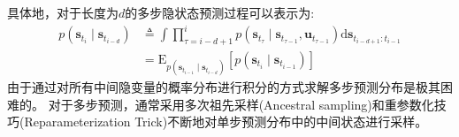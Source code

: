 具体地，对于长度为$d$的多步隐状态预测过程可以表示为:
\begin{equation}
\begin{aligned}
p\left(\boldsymbol{s}_{t_i} \mid \boldsymbol{s}_{t_{i-d}}\right) & \triangleq \int \prod_{\tau=i-d+1}^{i} p\left(\boldsymbol{s}_{t_\tau} \mid \boldsymbol{s}_{t_{\tau-1}},\boldsymbol{u}_{t_{\tau-1}}\right) \mathrm{d} \boldsymbol{s}_{t_{i-d+1}: t_{i-1}} \\
&=\mathrm{E}_{p\left(\boldsymbol{s}_{t_{i-1}} \mid \boldsymbol{s}_{t_{i-d}}\right)}\left[p\left(\boldsymbol{s}_{t_i} \mid \boldsymbol{s}_{t_{i-1}}\right)\right]
\end{aligned}
\label{equ:multistep}
\end{equation}
由于通过对所有中间隐变量的概率分布进行积分的方式求解多步预测分布是极其困难的。
对于多步预测，通常采用多次祖先采样(Ancestral sampling)和重参数化技巧(Reparameterization Trick)不断地对单步预测分布中的中间状态进行采样。

